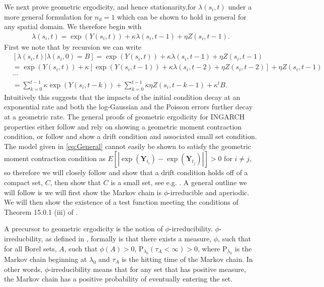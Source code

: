 \documentclass[11pt]{isuthesis}
\begin{document}
We next prove geometric ergodicity, and hence stationarity,for $\lambda(s_i,t)$ under a more general formulation for $n_d=1$ which can be shown to hold in general for any spatial domain.  We therefore begin with
\begin{align}
	\lambda(s_i,t)= \exp(Y(s_i,t))+\kappa \lambda(s_i,t-1) + \eta Z(s_i,t-1) \label{eq:General}.
\end{align}
First we note that by recursion we can write
\begin{align*}
	& [\lambda(s_i,t)|\lambda(s_i,0)=B] = \exp(Y(s_i,t))+\kappa \lambda(s_i,t-1) + \eta Z(s_i,t-1)\\
	& = \exp(Y(s_i,t))+\kappa \left[\exp(Y(s_i,t-1))+\kappa \lambda(s_i,t-2) + \eta Z(s_i,t-2)\right] + \eta Z(s_i,t-1)\\
	&\cdots\\
	& =\sum_{k=0}^{t-1} \kappa\exp(Y(s_i,t-k)) +\sum_{k=0}^{t-1} \kappa\eta Z(s_i,t-k-1)+\kappa^t B. \label{eq:Recursion}
\end{align*}
Intuitively this suggests that the impacts of the initial condition decay at an exponential rate and both the log-Gaussian and the Poisson errors further decay at a geometric rate.  The general proofs of geometric ergodicity for INGARCH properties either follow \cite{davis2016theory} and rely on showing a geometric moment contraction condition, or follow \cite{fokianos2009poisson} and show a drift condition and associated small set condition.  The model given in \eqref{eq:General} cannot easily be shown to satisfy the geometric moment contraction condition as $E[|\exp(\boldsymbol{Y}_{t_i})-\exp(\boldsymbol{Y}_{t_j})|]>0$ for $i \neq j$, so therefore we will closely follow \cite{fokianos2009poisson} and show that a drift condition holds off of a compact set, $C$, then show that $C$ is a small set, see e.g. \cite{meyn2012markov}.  A general outline we will follow is we will first show the Markov chain is $\phi$-irreducible and aperiodic.  We will then show the existence of a test function meeting the conditions of Theorem 15.0.1 (iii) of \cite{meyn2012markov}.

A precursor to geometric ergodicity is the notion of $\phi$-irreducibility.  $\phi$-irreducbility, as defined in \cite{meyn2012markov}, formally is that there exists a measure, $\phi$, such that for all Borel sets, $A$, such that $\phi(A)>0$, $\mbox{P}_{\lambda_0}(\tau_A<\infty)>0$, where $\mbox{P}_{\lambda_0}$ is the Markov chain beginning at $\lambda_0$ and $\tau_A$ is the hitting time of the Markov chain.  In other words, $\phi$-irreducibility means that for any set that has positive measure, the Markov chain has a positive probability of eventually entering the set.
\end{document}
